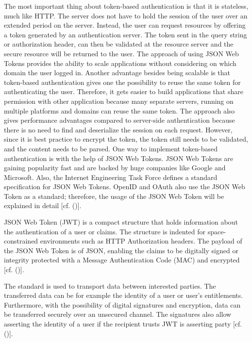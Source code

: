 The most important thing about token-based authentication is that it is stateless, much like HTTP. The server does not have to hold the session of the user over an extended period on the server. Instead, the user can request resources by offering a token generated by an authentication server. The token sent in the query string or authorization header, can then be validated at the resource server and the secure resource will be returned to the user. The approach of using JSON Web Tokens provides the ability to scale applications without considering on which domain the user logged in. Another advantage besides being scalable is that token-based authentication gives one the possibility to reuse the same token for authenticating the user. Therefore, it gets easier to build applications that share permission with other application because many separate servers, running on multiple platforms and domains can reuse the same token. The approach also gives performance advantages compared to server-side authentication because there is no need to find and deserialize the session on each request. However, since it is best practice to encrypt the token, the token still needs to be validated, and the content needs to be parsed. One way to implement token-based authentication is with the help of JSON Web Tokens. JSON Web Tokens are gaining popularity fast and are backed by huge companies like Google and Microsoft. Also, the Internet Engineering Task Force defines a standard specification for JSON Web Tokens. OpenID and OAuth also use the JSON Web Token as a standard; therefore, the usage of the JSON Web Token will be explained in detail [cf. (\cite{Tkalec:2015})].


JSON Web Token (JWT) is a compact structure that holds information about the authentication of a user or claims. The structure is indented for space-constrained environments such as HTTP Authorization headers. The payload of the JSON Web Token is of JSON, enabling the claims to be digitally signed or integrity protected with a Message Authentication Code (MAC) and encrypted [cf. (\cite{JWT:IETF:Jones:2015})].

The standard is used to transport data between interested parties. The transferred data can be for example the identity of a user or user’s entitlements. Furthermore, with the possibility of digital signatures and encryption, data can be transferred securely over an unsecured channel. The signatures also allow asserting the identity of a user if the recipient trusts JWT is asserting party [cf. (\cite{Siriwardena:JWTJWSJWE:2016})].


